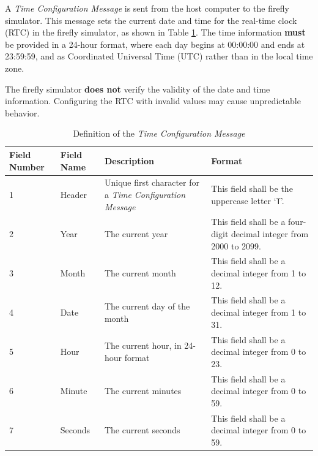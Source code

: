 \documentclass[letterpaper,11pt]{article}
\begin{document}
A \textit{Time Configuration Message} is sent from the host computer to the
firefly simulator. This message sets the current date and time for the
real-time clock (RTC) in the firefly simulator, as shown in Table
\ref{tab:TimeConfig}. The time information \textbf{must} be provided
in a 24-hour format, where each day begins at 00:00:00 and ends at 23:59:59,
and as Coordinated Universal Time (UTC) rather than in the local time zone.

The firefly simulator \textbf{does not} verify the validity of the date and
time information. Configuring the RTC with invalid values may cause
unpredictable behavior.

\begin{table}[H]
\centering
\caption{Definition of the \textit{Time Configuration Message}}
\label{tab:TimeConfig}
\setlength\extrarowheight{2pt}
\begin{tabular}[h]{|p{0.5in}|p{1.00in}|p{2.25in}|p{2.25in}|} \hline
Field Number & Field Name & Description & Format \\ \hline
1            & Header
             & Unique first character for a \textit{Time Configuration
             Message}
             & This field shall be the uppercase letter `\texttt{T}'.
             \\ \hline
2            & Year
             & The current year
             & This field shall be a four-digit decimal integer from 2000 to
             2099.
             \\ \hline
3            & Month
             & The current month
             & This field shall be a decimal integer from 1 to 12.
             \\ \hline
4            & Date
             & The current day of the month
             & This field shall be a decimal integer from 1 to 31.
             \\ \hline
5            & Hour
             & The current hour, in 24-hour format
             & This field shall be a decimal integer from 0 to 23.
             \\ \hline
6            & Minute
             & The current minutes
             & This field shall be a decimal integer from 0 to 59.
             \\ \hline
7            & Seconds
             & The current seconds
             & This field shall be a decimal integer from 0 to 59.
             \\ \hline
\end{tabular}
\end{table}
\end{document}
